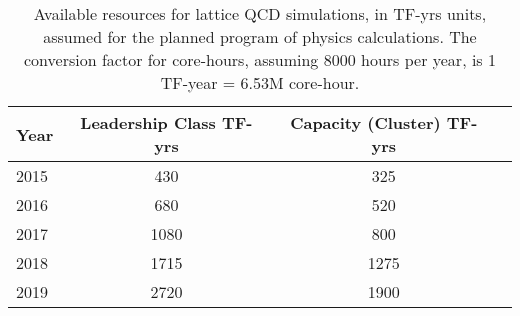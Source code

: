 

\begin{table}[t]
\begin{center}
\begin{tabular}{l|ccc}  
Year & Leadership Class TF-yrs & Capacity (Cluster) TF-yrs \\  \hline
2015 & 430 & 325 \\
2016 & 680 & 520 \\
2017 & 1080 & 800 \\
2018 & 1715 & 1275 \\ 
2019 & 2720 & 1900 \\ \hline
\end{tabular}
\caption{Available resources for lattice QCD simulations, in TF-yrs units,
assumed for the planned program of physics calculations.  The conversion
factor for core-hours, assuming 8000 hours per year, is 1 TF-year = 6.53M core-hour.}
\label{tab:fiveyear}
\end{center}
\end{table}

